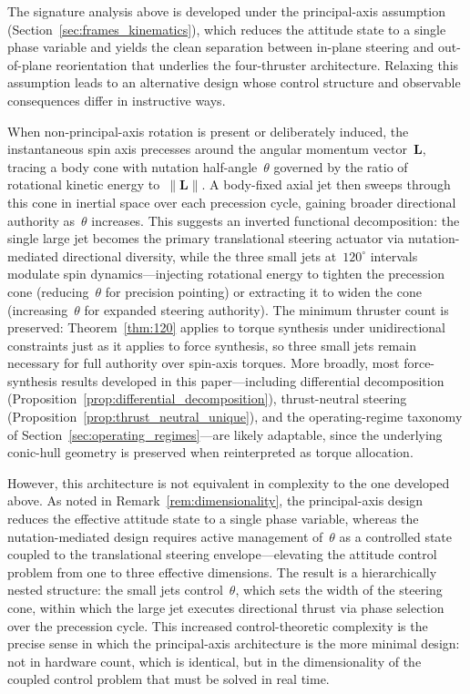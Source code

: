 \documentclass{article}
\begin{document}
The signature analysis above is developed under the principal-axis assumption
(Section~\ref{sec:frames_kinematics}), which reduces the attitude state to a single phase
variable and yields the clean separation between in-plane steering and out-of-plane
reorientation that underlies the four-thruster architecture. Relaxing this assumption leads
to an alternative design whose control structure and observable consequences differ in
instructive ways.

When non-principal-axis rotation is present or deliberately induced, the instantaneous spin
axis precesses around the angular momentum vector~$\mathbf{L}$, tracing a body cone with
nutation half-angle~$\theta$ governed by the ratio of rotational kinetic energy
to~$\|\mathbf{L}\|$. A body-fixed axial jet then sweeps through this cone in inertial space
over each precession cycle, gaining broader directional authority as~$\theta$ increases. This
suggests an inverted functional decomposition: the single large jet becomes the primary
translational steering actuator via nutation-mediated directional diversity, while the three
small jets at~$120^\circ$ intervals modulate spin dynamics---injecting rotational energy to
tighten the precession cone (reducing~$\theta$ for precision pointing) or extracting it to
widen the cone (increasing~$\theta$ for expanded steering authority). The minimum thruster
count is preserved: Theorem~\ref{thm:120} applies to torque synthesis under unidirectional
constraints just as it applies to force synthesis, so three small jets remain necessary for
full authority over spin-axis torques. More broadly, most force-synthesis results developed
in this paper---including differential decomposition
(Proposition~\ref{prop:differential_decomposition}), thrust-neutral steering
(Proposition~\ref{prop:thrust_neutral_unique}), and the operating-regime taxonomy of
Section~\ref{sec:operating_regimes}---are likely adaptable, since the underlying
conic-hull geometry is preserved when reinterpreted as torque allocation.

However, this architecture is not equivalent in complexity to the one developed above. As
noted in Remark~\ref{rem:dimensionality}, the principal-axis design reduces the effective
attitude state to a single phase variable, whereas the nutation-mediated design requires
active management of~$\theta$ as a controlled state coupled to the translational steering
envelope---elevating the attitude control problem from one to three effective dimensions.
The result is a hierarchically nested structure: the small jets control~$\theta$,
which sets the width of the steering cone, within which the large jet executes directional
thrust via phase selection over the precession cycle. This increased control-theoretic
complexity is the precise sense in which the principal-axis architecture is
the more minimal design: not in hardware count, which is identical, but in the
dimensionality of the coupled control problem that must be solved in real time.
\end{document}

